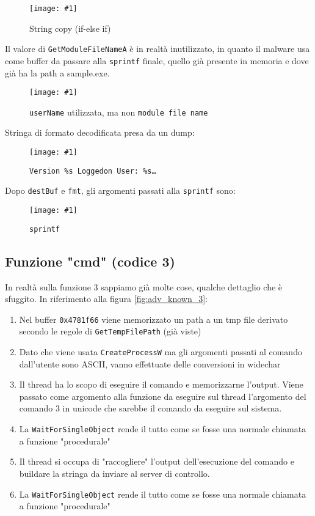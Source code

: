 \documentclass[
    a4paper, %
    11pt %
]{article}
\newcommand{\pic}[4]{\begin{figure}[H]
            \centering
            \texttt{[image: \#1]}
            \caption{#2}
            \label{fig:#1}
            \end{figure}}
\begin{document}
            \pic{adv_known_6_persistencymode_cpy}{String copy (if-else if)}{12cm}{16cm}

            Il valore di \texttt{GetModuleFileNameA} è in realtà inutilizzato, in quanto il malware usa come
            buffer da passare alla \texttt{sprintf} finale, quello già presente in memoria e dove già ha la path a 
            sample.exe.

            \pic{adv_known_6_gun_gmfn}{\texttt{userName} utilizzata, ma non \texttt{module file name}}{10cm}{5cm}

            Stringa di formato decodificata presa da un dump:

            \pic{adv_known_6_fmtdecrypt}{\texttt{Version \%s Loggedon User: \%s\dots}}{15cm}{4cm}

            Dopo \texttt{destBuf} e \texttt{fmt}, gli argomenti passati alla \texttt{sprintf} sono:

            \pic{adv_known_6_sprintf}{\texttt{sprintf}}{15cm}{4cm}

            \subsection{Funzione "cmd" (codice 3)}

            In realtà sulla funzione $3$ sappiamo già molte cose, qualche dettaglio che è sfuggito. In riferimento alla figura \ref{fig:adv_known_3}:

            \begin{enumerate}
                \item Nel buffer \texttt{0x4781f66} viene memorizzato un path a un tmp file derivato secondo
                le regole di \texttt{GetTempFilePath} (già viste)
                \item Dato che viene usata \texttt{CreateProcessW} ma gli argomenti passati al comando
                dall'utente sono ASCII, vanno effettuate delle conversioni in widechar
                \item Il thread ha lo scopo di eseguire il comando e memorizzarne l'output. Viene passato
                come argomento alla funzione da eseguire sul thread l'argomento del comando 3 in unicode che sarebbe il
                comando da eseguire sul sistema.
                \item La \texttt{WaitForSingleObject} rende il tutto come se fosse una normale chiamata a 
                funzione "procedurale"
                \item Il thread si occupa di "raccogliere" l'output dell'esecuzione del comando e buildare la stringa da inviare al server di controllo.
                \item La \texttt{WaitForSingleObject} rende il tutto come se fosse una normale chiamata a 
                funzione "procedurale"
            \end{enumerate}
\end{document}
